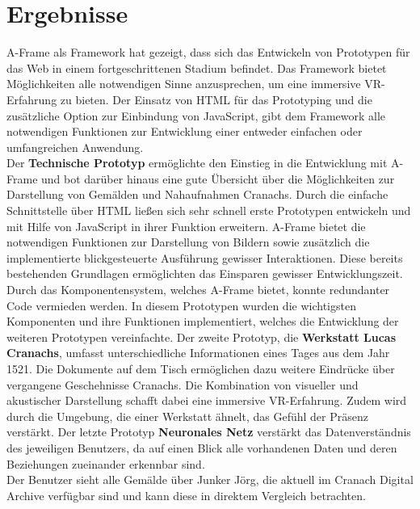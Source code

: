 \documentclass[a4paper,12pt,oneside]{article}
\begin{document}
  \section{Ergebnisse}
    A-Frame als Framework hat gezeigt, dass sich das Entwickeln von Prototypen
    für das Web in einem fortgeschrittenen Stadium befindet. Das Framework
    bietet Möglichkeiten alle notwendigen Sinne anzusprechen, um eine
    immersive VR-Erfahrung zu bieten. 
    Der Einsatz von HTML für das Prototyping und die zusätzliche 
    Option zur Einbindung von JavaScript, gibt dem Framework alle
    notwendigen Funktionen zur Entwicklung einer entweder einfachen
    oder umfangreichen Anwendung. \\
    Der \textbf{Technische Prototyp} ermöglichte den Einstieg in 
    die Entwicklung mit A-Frame und bot darüber hinaus eine gute 
    Übersicht über die Möglichkeiten zur Darstellung von Gemälden 
    und Nahaufnahmen Cranachs. 
    Durch die einfache Schnittstelle über HTML ließen sich sehr
    schnell erste Prototypen entwickeln und mit Hilfe von JavaScript 
    in ihrer Funktion erweitern. 
    A-Frame bietet die notwendigen Funktionen zur Darstellung von
    Bildern sowie zusätzlich die implementierte blickgesteuerte
    Ausführung gewisser Interaktionen. Diese bereits bestehenden
    Grundlagen ermöglichten das Einsparen gewisser Entwicklungszeit.    
    Durch das Komponentensystem, 
    welches A-Frame bietet, konnte redundanter Code
    vermieden werden. In diesem Prototypen wurden die wichtigsten
    Komponenten und ihre Funktionen implementiert, welches die
    Entwicklung der weiteren Prototypen vereinfachte.
    Der zweite Prototyp, die \textbf{Werkstatt Lucas Cranachs}, 
    umfasst unterschiedliche Informationen eines Tages aus dem Jahr 1521.
    Die Dokumente auf dem Tisch ermöglichen dazu weitere Eindrücke
    über vergangene Geschehnisse Cranachs.
    Die Kombination von visueller und akustischer Darstellung schafft
    dabei eine immersive VR-Erfahrung. Zudem wird durch die
    Umgebung, die einer Werkstatt ähnelt, das Gefühl der Präsenz verstärkt.
    Der letzte Prototyp \textbf{Neuronales Netz} verstärkt das Datenverständnis
    des jeweiligen Benutzers, da auf einen Blick alle vorhandenen Daten und
    deren Beziehungen zueinander erkennbar sind. \\
    Der Benutzer sieht alle
    Gemälde über Junker Jörg, die aktuell im Cranach Digital Archive verfügbar
    sind und kann diese in direktem Vergleich betrachten.
\end{document}
